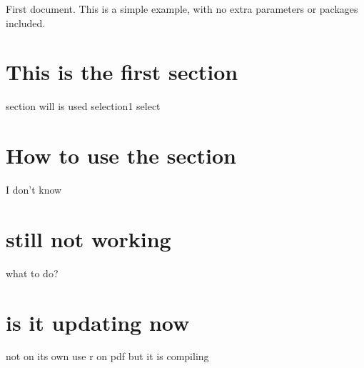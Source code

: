 \documentclass{article}
\begin{document}
First document. This is a simple example, with no extra parameters or packages included.
\section{This is the first section}
section will is used
selection1
select 
\section{How to use the section}
I don't know
\section{still not working}
what to do? 
\section{is it updating now}
not on its own use r on pdf 
but it is compiling
\end{document}
